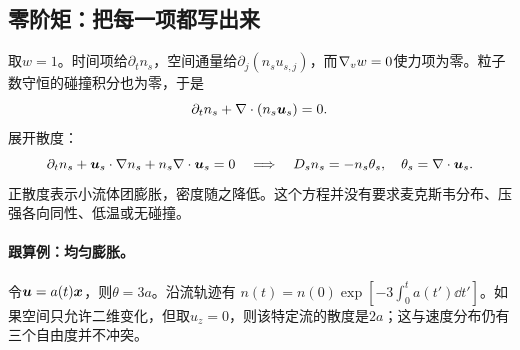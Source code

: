 \documentclass[UTF8,a4paper,11pt,openany,fontset=fandol]{ctexbook}
\begin{document}
\subsection{零阶矩：把每一项都写出来}
取$w=1$。时间项给$\partial_t n_s$，空间通量给$\partial_j(n_su_{s,j})$，而$\nabla_vw=0$使力项为零。粒子数守恒的碰撞积分也为零，于是
\begin{equation}
 \partial_tn_s+\nabla\cdot(n_s\bm{u}_s)=0.
 \label{eq:continuity}
\end{equation}
展开散度：
\begin{equation}
 \partial_t n_s+\bm{u}_s\cdot\nabla n_s+n_s\nabla\cdot\bm{u}_s=0
 \quad\Longrightarrow\quad
 D_sn_s=-n_s\theta_s,\quad\theta_s=\nabla\cdot\bm{u}_s.
\end{equation}
正散度表示小流体团膨胀，密度随之降低。这个方程并没有要求麦克斯韦分布、压强各向同性、低温或无碰撞。

\paragraph{跟算例：均匀膨胀。}
令$\bm{u}=a(t)\bm{x}$，则$\theta=3a$。沿流轨迹有
$n(t)=n(0)\exp[-3\int_0^ta(t')\dd t']$。如果空间只允许二维变化，但取$u_z=0$，则该特定流的散度是$2a$；这与速度分布仍有三个自由度并不冲突。
\end{document}
